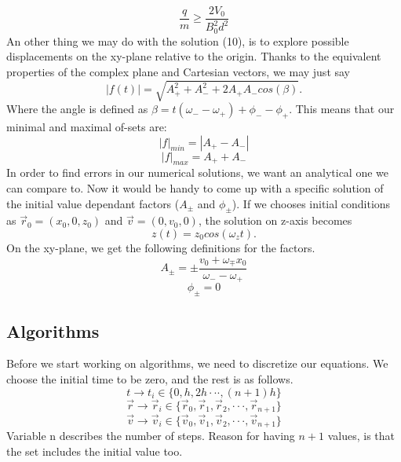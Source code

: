\documentclass[english,notitlepage,reprint,nofootinbib]{revtex4-1}
\begin{document}
\begin{equation}
    \frac{q}{m} \geq \frac{2V_0}{B_0^2d^2}
\end{equation}
An other thing we may do with the solution (10), is to explore possible displacements on the xy-plane relative to the origin. Thanks to the equivalent properties of the complex plane and Cartesian vectors, we may just say
$$ |f(t)| = \sqrt{A_+^2 + A_-^2 + 2 A_+ A_- cos(\beta)} .$$
Where the angle is defined as $\beta = t(\omega_- - \omega_+) + \phi_- - \phi_+$. This means that our minimal and maximal of-sets are:
\begin{equation}
|f|_{min} = |A_+ - A_-|
\end{equation}
\begin{equation}
|f|_{max} = A_+ + A_-
\end{equation}
In order to find errors in our numerical solutions, we want an analytical one we can compare to. Now it would be handy to come up with a specific solution of the initial value dependant factors ($A_{\pm}$ and $\phi_{\pm}$). If we chooses initial conditions as $\vec{r}_0 = (x_0, 0, z_0)$ and $\vec{v} = (0,v_0,0)$, the solution on z-axis becomes
\begin{equation}
z(t) = z_0 cos(\omega_z t).
\end{equation}
On the xy-plane, we get the following definitions for the factors.
\begin{equation}
A_{\pm} = \pm \frac{v_0 + \omega_{\mp} x_0}{\omega_- - \omega_+}
\end{equation}
\begin{equation}
\phi_{\pm} = 0
\end{equation}

\subsection*{Algorithms}

Before we start working on algorithms, we need to discretize our equations. We choose the initial time to be zero, and the rest is as follows.
$$ t \rightarrow t_i \in \{ 0, h, 2h \cdot \cdot \cdot , (n+1)h \} $$
\begin{equation}
    \vec{r} \rightarrow \vec{r}_i \in \{ \vec{r}_0, \vec{r}_1, \vec{r}_2, \cdot \cdot \cdot, \vec{r}_{n+1} \}
\end{equation}
$$ \vec{v} \rightarrow \vec{v}_i \in \{ \vec{v}_0, \vec{v}_1, \vec{v}_2, \cdot \cdot \cdot, \vec{v}_{n+1} \} $$
Variable n describes the number of steps. Reason for having $n+1$ values, is that the set includes the initial value too.
\end{document}

